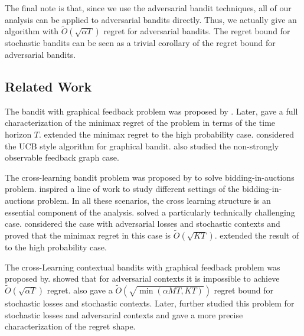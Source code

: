 The final note is that, since we use the adversarial bandit techniques, all of our analysis can be applied to adversarial bandits directly.
%
Thus, we actually give an algorithm with $\widetilde{O}(\sqrt{\alpha T})$ regret for adversarial bandits.
%
The regret bound for stochastic bandits can be seen as a trivial corollary of the regret bound for adversarial bandits.

\subsection{Related Work}
The bandit with graphical feedback problem was proposed by \citet{MS11}.
%
Later, \citet{GraphAlon15} gave a full characterization of the minimax regret of the problem in terms of the time horizon $T$.  \citet{neu2015,LuoGraph23} extended the minimax regret to the high probability case.
%
\citet{lykouris20a,Han24} considered the UCB style algorithm for graphical bandit.
%
\citet{GraphAlon15,Understanding2021} also studied the non-strongly observable feedback graph case.

The cross-learning bandit problem was proposed by \citet{Bal19} to solve bidding-in-auctions problem. \citet{Bal19} inspired a line of work to study different settings of the bidding-in-auctions problem\citep{Han2020Adversarial,Aiauction,WangAuction,Han24}. In all these scenarios, the cross learning structure is an essential component of the analysis. \citet{Sch23} solved a particularly technically challenging case. \citet{Sch23} considered the case with adversarial losses and stochastic contexts and proved that the minimax regret in this case is $\widetilde{O}(\sqrt{KT})$. \citet{Huang2025} extended the result of \citet{Sch23} to the high probability case.

The cross-Learning contextual bandits with graphical feedback problem was proposed by\citet{Han24}. \citet{Han24} showed that for adversarial contexts it is impossible to achieve $\widetilde{O}(\sqrt{\alpha T})$ regret. \citet{Han24} also gave a $\widetilde{O}(\sqrt{\min(\alpha MT,KT)})$ regret bound for stochastic losses and stochastic contexts. Later, \citet{MAS24} further studied this problem for stochastic losses and adversarial contexts and gave a more precise characterization of the regret shape. 